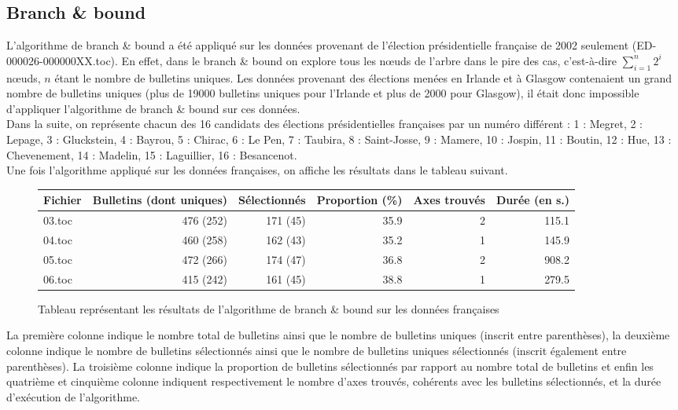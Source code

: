 \documentclass[11pt, a4paper]{article}
\begin{document}
\subsection{Branch \& bound}

L'algorithme de branch \& bound a été appliqué sur les données provenant de l’élection présidentielle française de 2002 seulement (ED-000026-000000XX.toc). En effet, dans le branch \& bound on explore tous les nœuds de l'arbre dans le pire des cas, c'est-à-dire $\sum_{i = 1}^{n} 2^{ i}$ nœuds, $n$ étant le nombre de bulletins uniques. Les données provenant des élections menées en Irlande et à Glasgow contenaient un grand nombre de bulletins uniques (plus de 19000 bulletins uniques pour l'Irlande et plus de 2000 pour Glasgow), il était donc impossible d'appliquer l'algorithme de branch \& bound sur ces données.\\

Dans la suite, on représente chacun des 16 candidats des élections présidentielles françaises par un numéro différent : 1 : Megret, 2 : Lepage, 3 : Gluckstein, 4 : Bayrou, 5 : Chirac, 6 : Le Pen, 7 : Taubira, 8 : Saint-Josse, 9 : Mamere, 10 : Jospin, 11 : Boutin, 12 : Hue, 13 : Chevenement, 14 : Madelin, 15 : Laguillier, 16 : Besancenot.\\

Une fois l'algorithme appliqué sur les données françaises, on affiche les résultats dans le tableau suivant.

\noindent
\begin{figure}[H]
\begin{tabular}{ | p{1.4cm} | r | r | r | r | r |}
\hline
Fichier & Bulletins (dont uniques) & Sélectionnés & Proportion (\%) & Axes trouvés & Durée (en s.)\\ \hline
03.toc & 476 (252) & 171 (45) & 35.9 & 2 & 115.1 \\ \hline
04.toc & 460 (258) & 162 (43) & 35.2 & 1 & 145.9 \\ \hline
05.toc & 472 (266) & 174 (47) & 36.8 & 2 & 908.2 \\ \hline
06.toc & 415 (242) & 161 (45) & 38.8 & 1 & 279.5 \\ \hline
\end{tabular}
\label{BnB-results1}
\caption{Tableau représentant les résultats de l'algorithme de branch \& bound sur les données françaises}
\end{figure}

\noindent La première colonne indique le nombre total de bulletins ainsi que le nombre de bulletins uniques (inscrit entre parenthèses), la deuxième colonne indique le nombre de bulletins sélectionnés ainsi que le nombre de bulletins uniques sélectionnés (inscrit également entre parenthèses). La troisième colonne indique la proportion de bulletins sélectionnés par rapport au nombre total de bulletins et enfin les quatrième et cinquième colonne indiquent respectivement le nombre d'axes trouvés, cohérents avec les bulletins sélectionnés, et la durée d'exécution de l'algorithme.\\
\end{document}
